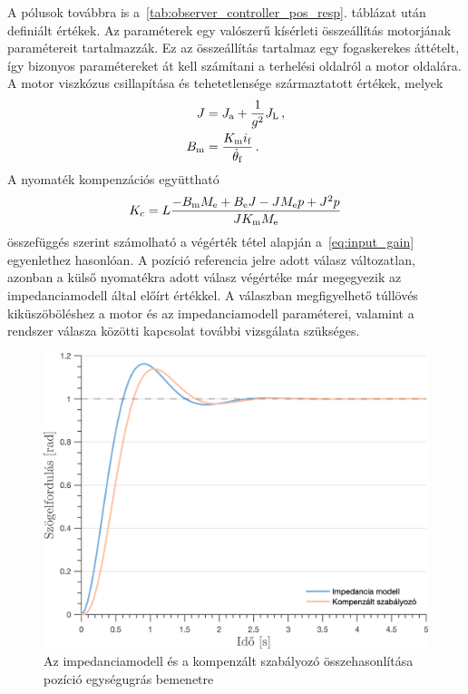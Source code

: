 A pólusok továbbra is a~\ref{tab:observer_controller_pos_resp}. táblázat után definiált értékek. 
Az paraméterek egy valószerű kísérleti összeállítás motorjának paramétereit 
tartalmazzák. Ez az összeállítás tartalmaz egy fogaskerekes áttételt, így bizonyos paramétereket 
át kell számítani a terhelési oldalról a motor oldalára. A motor viszkózus csillapítása és tehetetlensége származtatott értékek, melyek 
\begin{align}
    \begin{split}
        J &= J_{\mathrm{a}} + \frac{1}{g^2}J_{\mathrm{L}}\,, \\
        B_{\mathrm{m}} &= \frac{K_{\mathrm{m}} i_{\mathrm{f}}}{\dot{\theta}_{\mathrm{f}}}\,.
    \end{split}
\end{align}
A nyomaték kompenzációs együttható
\begin{equation}
    K_{\mathrm{c}} = L\frac{- B_{\mathrm{m}} M_{\mathrm{e}} + B_{\mathrm{e}} J - J M_{\mathrm{e}} p + J^2 p}{J K_{\mathrm{m}} M_{\mathrm{e}}}
\end{equation}
összefüggés szerint számolható a végérték tétel alapján a~\eqref{eq:input_gain} egyenlethez hasonlóan.
A pozíció referencia jelre adott válasz változatlan, azonban a külső nyomatékra adott válasz végértéke már
megegyezik az impedanciamodell által előírt értékkel. A válaszban megfigyelhető túllövés kiküszöböléshez
a motor és az impedanciamodell paraméterei, valamint a rendszer válasza közötti kapcsolat további vizsgálata szükséges.

\begin{figure}[ht]
    \begin{center}
    \includegraphics[width=\textwidth]{images/observer_controller_pos_resp_direct_comp.png}
    \caption{Az impedanciamodell és a kompenzált szabályozó összehasonlítása pozíció egységugrás bemenetre}\label{fig:observer_controller_pos_resp_direct}
    \end{center}
\end{figure}

